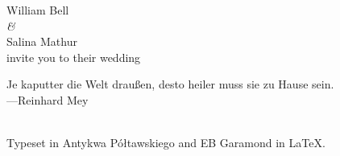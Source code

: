\documentclass{article}
\renewcommand{\c}[1]{{\textcolor{christmas}{#1}}}
\begin{document}
%
\centering%

{\LARGE William Bell}\\\vfill
{\setmainfont{EB Garamond}\LARGE\textit{\c{\&}}}\\\vfill
{\LARGE Salina Mathur}\\[2mm]
{\large invite you to their wedding}\\


\vfill\begin{minipage}[c]{.8\textwidth}\centering%
    \c{\glqq}Je kaputter die Welt draußen,
    desto heiler muss sie zu Hause sein.\c{\grqq}\\[2mm]
    \c{---}Reinhard Mey
\end{minipage}

\newpage\restoregeometry %
~\\[-2\baselineskip]\vfill
{\small Typeset in Antykwa Półtawskiego and EB Garamond in \LaTeX.}
\end{document}
